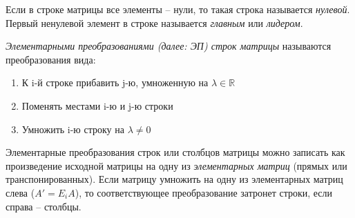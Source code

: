 \begin{df}
  Если в строке матрицы все элементы -- нули, то такая строка
  называется \emph{нулевой}. Первый ненулевой элемент в строке
  называется \emph{главным} или \emph{лидером}.
\end{df}
  
\begin{df}
  \emph{Элементарными преобразованиями (далее: ЭП) строк
    матрицы} называются
    преобразования вида:
  \begin{enumerate}
  \item К i-й строке прибавить j-ю, умноженную на $\lambda\in\mathbb R$
  \item Поменять местами i-ю и j-ю строки
  \item Умножить i-ю строку на $\lambda\ne0$
  \end{enumerate}
  Элементарные преобразования строк или столбцов матрицы можно
  записать как произведение исходной матрицы на одну из
  \emph{элементарных матриц} (прямых или
  транспонированных). Если матрицу умножить на одну из элементарных
  матриц слева ($A'=E_iA$), то соответствующее преобразование затронет
  строки, если справа -- столбцы.
  

\end{df}
